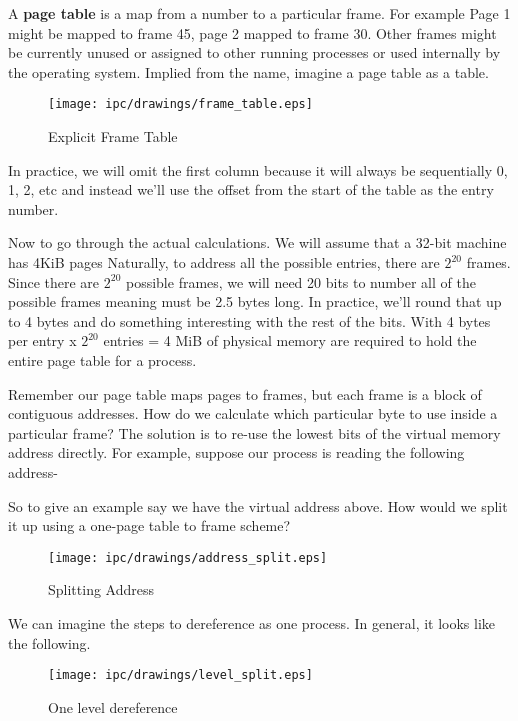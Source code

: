 A \textbf{page table} is a map from a number to a particular frame.
For example Page 1 might be mapped to frame 45, page 2 mapped to frame 30.
Other frames might be currently unused or assigned to other running processes or used internally by the operating system.
Implied from the name, imagine a page table as a table.
	 
\begin{figure}[H]
	\centering
	\texttt{[image: ipc/drawings/frame\_table.eps]}
	\caption{Explicit Frame Table}
\end{figure}
	 
In practice, we will omit the first column because it will always be sequentially 0, 1, 2, etc and instead we'll use the offset from the start of the table as the entry number.
	 
Now to go through the actual calculations.
We will assume that a 32-bit machine has 4KiB pages
Naturally, to address all the possible entries, there are $2^{20}$ frames.
Since there are $2^{20}$ possible frames, we will need 20 bits to number all of the possible frames meaning  must be 2.5 bytes long.
In practice, we'll round that up to 4 bytes and do something interesting with the rest of the bits.
With 4 bytes per entry x $2^{20}$ entries = 4 MiB of physical memory are required to hold the entire page table for a process.
	 
Remember our page table maps pages to frames, but each frame is a block of contiguous addresses.
How do we calculate which particular byte to use inside a particular frame?
The solution is to re-use the lowest bits of the virtual memory address directly.
For example, suppose our process is reading the following address- 
	 
So to give an example say we have the virtual address above.
How would we split it up using a one-page table to frame scheme?
	 
\begin{figure}[H]
	\centering
	\texttt{[image: ipc/drawings/address\_split.eps]}
	\caption{Splitting Address}
\end{figure}
	 
We can imagine the steps to dereference as one process.
In general, it looks like the following.
	 
\begin{figure}[H]
	\centering
	\texttt{[image: ipc/drawings/level\_split.eps]}
	\caption{One level dereference}
\end{figure}
	 
